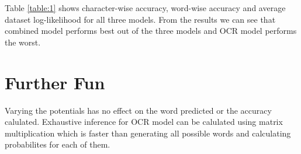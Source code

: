 \documentclass[paper=a4, fontsize=11pt]{scrartcl} %
\numberwithin{equation}{section} %
\numberwithin{figure}{section} %
\numberwithin{table}{section} %
\begin{document}
Table \ref{table:1} shows character-wise accuracy, word-wise accuracy and average dataset log-likelihood for all three models. From the results we can see that combined model performs best out of the three models and OCR model performs the worst.


\section{Further Fun}

\par

Varying the potentials has no effect on the word predicted or the accuracy calulated. Exhaustive inference for OCR model can be calulated using matrix multiplication which is faster than generating all possible words and calculating probabilites for each of them.
\end{document}
